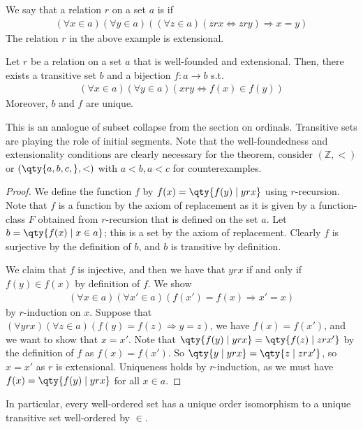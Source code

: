 We say that a relation $r$ on a set $a$ is  if
\begin{align*}
        (\forall x \in a)(\forall y \in a)((\forall z \in a)(zrx \Leftrightarrow zry) \Rightarrow x = y)
    \end{align*}
The relation $r$ in the above example is extensional.
\begin{theorem}
    Let $r$ be a relation on a set $a$ that is well-founded and extensional.
    Then, there exists a transitive set $b$ and a bijection $f \colon a \to b$ s.t.
    \begin{align*}
        (\forall x \in a)(\forall y \in a)(x r y \Leftrightarrow f(x) \in f(y))
    \end{align*}
    Moreover, $b$ and $f$ are unique.
\end{theorem}
This is an analogue of subset collapse from the section on ordinals.
Transitive sets are playing the role of initial segments.
Note that the well-foundedness and extensionality conditions are clearly necessary for the theorem, consider $(\mathbb Z, <)$ or $(\qty{a,b,c,},<)$ with $a<b, a<c$ for counterexamples.
\begin{proof}
    We define the function $f$ by $f(x) = \qty{f(y) \mid y r x}$ using $r$-recursion.
    Note that $f$ is a function by the axiom of replacement as it is given by a function-class $F$ obtained from $r$-recursion that is defined on the set $a$.
    Let $b = \qty{f(x) \mid x \in a}$; this is a set by the axiom of replacement.
    Clearly $f$ is surjective by the definition of $b$, and $b$ is transitive by definition.

    We claim that $f$ is injective, and then we have that $yrx$ if and only if $f(y) \in f(x)$ by definition of $f$.
    We show
    \begin{align*}
        (\forall x \in a)(\forall x' \in a)(f(x') = f(x) \Rightarrow x' = x)
    \end{align*}
    by $r$-induction on $x$.
    Suppose that $(\forall y r x)(\forall z \in a)(f(y) = f(z) \Rightarrow y = z)$, we have $f(x) = f(x')$, and we want to show that $x = x'$.
    Note that $\qty{f(y) \mid y r x} = \qty{f(z) \mid z r x'}$ by the definition of $f$ as $f(x) = f(x')$.
    So $\qty{y \mid y r x} = \qty{z \mid z r x'}$, so $x = x'$ as $r$ is extensional.
    Uniqueness holds by $r$-induction, as we must have $f(x) = \qty{f(y) \mid y r x}$ for all $x \in a$.
\end{proof}
In particular, every well-ordered set has a unique order isomorphism to a unique transitive set well-ordered by $\in$.
